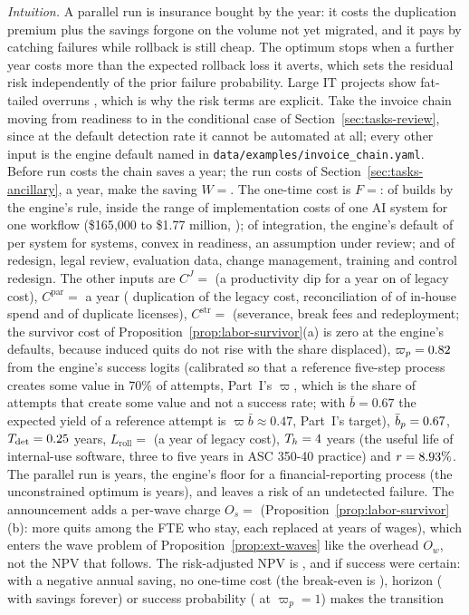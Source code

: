 \noindent\emph{Intuition.} A parallel run is insurance bought by the year: it costs the duplication premium plus the savings forgone on the volume not yet migrated, and it pays by catching failures while rollback is still cheap. The optimum stops when a further year costs more than the expected rollback loss it averts, which sets the residual risk independently of the prior failure probability. Large IT projects show fat-tailed overruns \citep{flyvbjerg2011why}, which is why the risk terms are explicit. Take the invoice chain moving from readiness \icIotaLow{} to \icIotaHigh{} in the conditional case of Section~\ref{sec:tasks-review}, since at the default detection rate it cannot be automated at all; every other input is the engine default named in \texttt{data/examples/invoice\_chain.yaml}. Before run costs the chain saves \icWbeforeRun{} a year; the run costs of Section~\ref{sec:tasks-ancillary}, \icRunTotal{} a year, make the saving $W={}$\icW. The one-time cost is $F={}$\icF: \icFbuild{} of builds by the engine's rule, inside the range of implementation costs of one AI system for one workflow (\$165{,}000 to \$1.77 million, \citealp{svanberg2024beyond}); \icFint{} of integration, the engine's default of \icIntCost{} per system for \icNsys{} systems, convex in readiness, an assumption under review; and \icFother{} of redesign, legal review, evaluation data, change management, training and control redesign. The other inputs are $C^J={}$\icCJ{} (a \icDipShare{} productivity dip for a year on \icCzero{} of legacy cost), $C^{\mathrm{par}}={}$\icCpar{} a year (\icOmegaPar{} duplication of the legacy cost, reconciliation of \icNuRec{} of in-house spend and \icCdup{} of duplicate licenses), $C^{\mathrm{str}}={}$\icCstr{} (severance, break fees and redeployment; the survivor cost of Proposition~\ref{prop:labor-survivor}(a) is zero at the engine's defaults, because induced quits do not rise with the share displaced), $\varpi_p=0.82$ from the engine's success logits (calibrated so that a reference five-step process creates some value in 70\% of attempts, Part~I's $\varpi$, which is the share of attempts that create some value and not a success rate; with $\bar b=0.67$ the expected yield of a reference attempt is $\varpi\bar b\approx0.47$, Part~I's target), $\bar b_p=0.67$, $T_{\mathrm{det}}=0.25$ years, $L_{\mathrm{roll}}={}$\icLroll{} (a year of legacy cost), $T_h=4$ years (the useful life of internal-use software, three to five years in ASC 350-40 practice) and $r=8.93\%$. The parallel run is \icTpar{} years, the engine's floor for a financial-reporting process (the unconstrained optimum is \icTparStar{} years), and leaves a \icResid{} risk of an undetected failure. The announcement adds a per-wave charge $O_s={}$\icOs{} (Proposition~\ref{prop:labor-survivor}(b): \icExcessQuits{} more quits among the \icNsv{} FTE who stay, each replaced at \icCrep{} years of wages), which enters the wave problem of Proposition~\ref{prop:ext-waves} like the overhead $O_w$, not the NPV that follows. The risk-adjusted NPV is \icNPV, and \icNPVcertain{} if success were certain: with a negative annual saving, no one-time cost (the break-even is \icFbreakeven), horizon (\icNPVunlimited{} with savings forever) or success probability (\icNPVvarpiOne{} at $\varpi_p=1$) makes the transition 